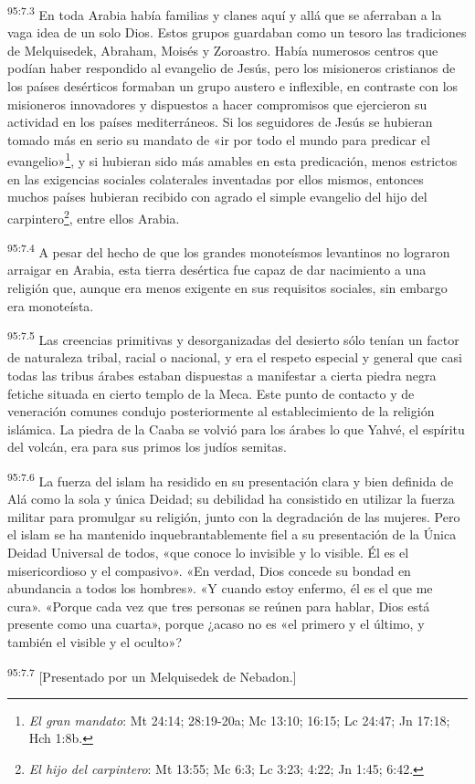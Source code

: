 \par
\textsuperscript{95:7.3} En toda Arabia había familias y clanes aquí y allá que se aferraban a la vaga idea de un solo Dios. Estos grupos guardaban como un tesoro las tradiciones de Melquisedek, Abraham, Moisés y Zoroastro. Había numerosos centros que podían haber respondido al evangelio de Jesús, pero los misioneros cristianos de los países desérticos formaban un grupo austero e inflexible, en contraste con los misioneros innovadores y dispuestos a hacer compromisos que ejercieron su actividad en los países mediterráneos. Si los seguidores de Jesús se hubieran tomado más en serio su mandato de «ir por todo el mundo para predicar el evangelio»\footnote{\textit{El gran mandato}: Mt 24:14; 28:19-20a; Mc 13:10; 16:15; Lc 24:47; Jn 17:18; Hch 1:8b.}, y si hubieran sido más amables en esta predicación, menos estrictos en las exigencias sociales colaterales inventadas por ellos mismos, entonces muchos países hubieran recibido con agrado el simple evangelio del hijo del carpintero\footnote{\textit{El hijo del carpintero}: Mt 13:55; Mc 6:3; Lc 3:23; 4:22; Jn 1:45; 6:42.}, entre ellos Arabia.

\par
\textsuperscript{95:7.4} A pesar del hecho de que los grandes monoteísmos levantinos no lograron arraigar en Arabia, esta tierra desértica fue capaz de dar nacimiento a una religión que, aunque era menos exigente en sus requisitos sociales, sin embargo era monoteísta.

\par
\textsuperscript{95:7.5} Las creencias primitivas y desorganizadas del desierto sólo tenían un factor de naturaleza tribal, racial o nacional, y era el respeto especial y general que casi todas las tribus árabes estaban dispuestas a manifestar a cierta piedra negra fetiche situada en cierto templo de la Meca. Este punto de contacto y de veneración comunes condujo posteriormente al establecimiento de la religión islámica. La piedra de la Caaba se volvió para los árabes lo que Yahvé, el espíritu del volcán, era para sus primos los judíos semitas.

\par
\textsuperscript{95:7.6} La fuerza del islam ha residido en su presentación clara y bien definida de Alá como la sola y única Deidad; su debilidad ha consistido en utilizar la fuerza militar para promulgar su religión, junto con la degradación de las mujeres. Pero el islam se ha mantenido inquebrantablemente fiel a su presentación de la Única Deidad Universal de todos, «que conoce lo invisible y lo visible. Él es el misericordioso y el compasivo». «En verdad, Dios concede su bondad en abundancia a todos los hombres». «Y cuando estoy enfermo, él es el que me cura». «Porque cada vez que tres personas se reúnen para hablar, Dios está presente como una cuarta», porque ¿acaso no es «el primero y el último, y también el visible y el oculto»?

\par
\textsuperscript{95:7.7} [Presentado por un Melquisedek de Nebadon.]